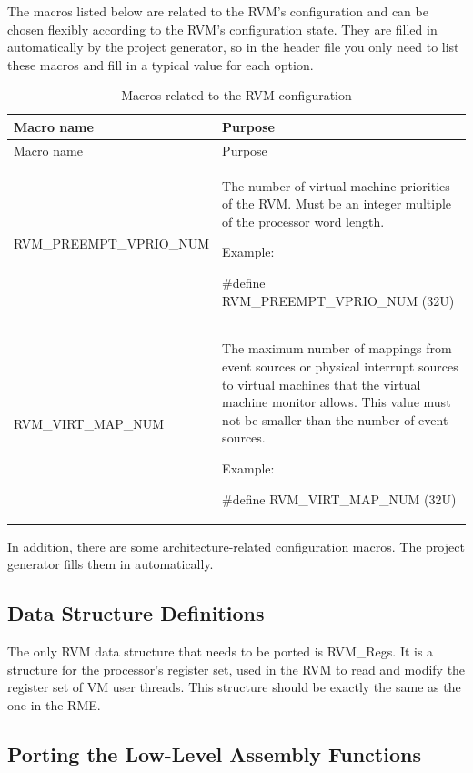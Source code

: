 The macros listed below are related to the RVM's configuration and can be chosen flexibly according to the RVM's configuration state. They are filled in automatically by the project generator, so in the header file you only need to list these macros and fill in a typical value for each option.

\begin{xltabular}{\textwidth}{@{}>{\hsize\raggedright\arraybackslash}X>{\hsize\raggedright\arraybackslash}X@{}}
\caption{Macros related to the RVM configuration}\label{tab:8-5}\\
\toprule
Macro name & Purpose\tabularnewline
\endfirsthead
\toprule
Macro name & Purpose\tabularnewline
\midrule
\endhead
\bottomrule
\endlastfoot
RVM\_\allowbreak{}PREEMPT\_\allowbreak{}VPRIO\_\allowbreak{}NUM\strut
 & The number of virtual machine priorities of the RVM. Must be an integer multiple of the processor word length.

Example:

\#define RVM\_\allowbreak{}PREEMPT\_\allowbreak{}VPRIO\_\allowbreak{}NUM (32U)\strut
\tabularnewline
RVM\_\allowbreak{}VIRT\_\allowbreak{}MAP\_\allowbreak{}NUM\strut
 & The maximum number of mappings from event sources or physical interrupt sources to virtual machines that the virtual machine monitor allows. This value must not be smaller than the number of event sources.

Example:

\#define RVM\_\allowbreak{}VIRT\_\allowbreak{}MAP\_\allowbreak{}NUM (32U)\strut
\tabularnewline
\end{xltabular}

In addition, there are some architecture-related configuration macros. The project generator fills them in automatically.

\subsection{Data Structure Definitions}\label{subsec:8-2-5}

The only RVM data structure that needs to be ported is RVM\_Regs. It is a structure for the processor's register set, used in the RVM to read and modify the register set of VM user threads. This structure should be exactly the same as the one in the RME.

\subsection{Porting the Low-Level Assembly Functions}\label{subsec:8-2-6}

